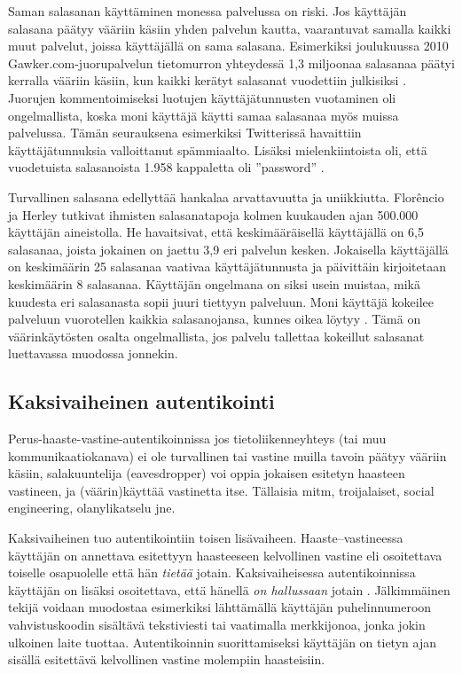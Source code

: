 \documentclass[english,gradu]{tktltiki}
\begin{document}
  Saman salasanan käyttäminen monessa palvelussa on riski. Jos käyttäjän salasana päätyy vääriin käsiin yhden palvelun kautta, vaarantuvat samalla kaikki muut palvelut, joissa käyttäjällä on sama salasana. Esimerkiksi joulukuussa 2010 Gawker.com-juorupalvelun tietomurron yhteydessä 1,3 miljoonaa salasanaa päätyi kerralla vääriin käsiin, kun kaikki kerätyt salasanat vuodettiin julkisiksi \cite{bbc_gawker_12_2010, forbes_gawker_12_2010}. Juorujen kommentoimiseksi luotujen käyttäjätunnusten vuotaminen oli ongelmallista, koska moni käyttäjä käytti samaa salasanaa myös muissa palvelussa. Tämän seurauksena esimerkiksi Twitterissä havaittiin käyttäjätunnuksia valloittanut spämmiaalto. Lisäksi mielenkiintoista oli, että vuodetuista salasanoista 1.958 kappaletta oli ''password'' \cite{forbes_gawker_12_2010}.

  Turvallinen salasana edellyttää hankalaa arvattavuutta ja uniikkiutta. Florêncio ja Herley \cite{study_of_passwords_07} tutkivat ihmisten salasanatapoja kolmen kuukauden ajan 500.000 käyttäjän aineistolla. He havaitsivat, että keskimääräisellä käyttäjällä on 6,5 salasanaa, joista jokainen on jaettu 3,9 eri palvelun kesken. Jokaisella käyttäjällä on keskimäärin 25 salasanaa vaativaa käyttäjätunnusta ja päivittäin kirjoitetaan keskimäärin 8 salasanaa. Käyttäjän ongelmana on siksi usein muistaa, mikä kuudesta eri salasanasta sopii juuri tiettyyn palveluun. Moni käyttäjä kokeilee palveluun vuorotellen kaikkia salasanojansa, kunnes oikea löytyy \cite{study_of_passwords_07}. Tämä on väärinkäytösten osalta ongelmallista, jos palvelu tallettaa kokeillut salasanat luettavassa muodossa jonnekin.


  \subsection{Kaksivaiheinen autentikointi} %
  \label{sub:kaksivaiheinen_autentikointi}

  Perus-haaste-vastine-autentikoinnissa jos tietoliikenneyhteys (tai muu kommunikaatiokanava) ei ole turvallinen tai vastine muilla tavoin päätyy vääriin käsiin, salakuuntelija (eavesdropper) voi oppia jokaisen esitetyn haasteen vastineen, ja (väärin)käyttää vastinetta itse.
  Tällaisia mitm, troijalaiset, social engineering, olanylikatselu jne.

  Kaksivaiheinen tuo autentikointiin toisen lisävaiheen. Haaste--vastineessa käyttäjän on annettava esitettyyn haasteeseen kelvollinen vastine eli osoitettava toiselle osapuolelle että hän \emph{tietää} jotain. Kaksivaiheisessa autentikoinnissa käyttäjän on lisäksi osoitettava, että hänellä \emph{on hallussaan} jotain \cite{NIST_SP800-63, google_2step_2010}. Jälkimmäinen tekijä voidaan muodostaa esimerkiksi lähttämällä käyttäjän puhelinnumeroon vahvistuskoodin sisältävä tekstiviesti tai vaatimalla merkkijonoa, jonka jokin ulkoinen laite tuottaa. Autentikoinnin suorittamiseksi käyttäjän on tietyn ajan sisällä esitettävä kelvollinen vastine molempiin haasteisiin.
\end{document}

